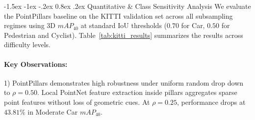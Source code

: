 \documentclass[10pt, a4paper, twocolumn]{article}
\makeatletter
\renewcommand\subsection{\@startsection{subsection}{2}{\z@}%
                                      {-1.5ex \@plus -1ex \@minus -.2ex}%
                                      {0.8ex \@plus .2ex}%
                                      {\normalfont\normalsize\bfseries}}
\makeatother
\begin{document}
\subsection{Quantitative \& Class Sensitivity Analysis}
We evaluate the PointPillars baseline on the KITTI validation set across all subsampling regimes using 3D $mAP_{40}$ at standard IoU thresholds ($0.70$ for Car, $0.50$ for Pedestrian and Cyclist). Table~\ref{tab:kitti_results} summarizes the results across difficulty levels.

\begin{table}[htbp]
\centering
\caption{3D $mAP_{40}$ performance across sparsification regimes on KITTI Validation Set.}
\label{tab:kitti_results}
\vspace{0.4em}
\end{table}

\paragraph{Key Observations:}

1) PointPillars demonstrates high robustness under uniform random drop down to $\rho = 0.50$. Local PointNet feature extraction inside pillars aggregates sparse point features without loss of geometric cues. At $\rho = 0.25$, performance drops at $43.81\%$ in Moderate Car $mAP_{40}$.
\end{document}
